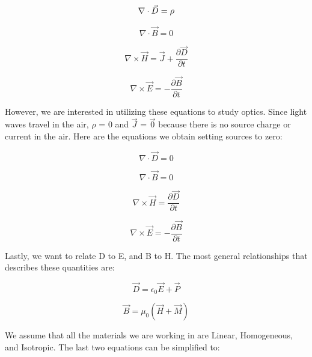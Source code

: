\documentclass[12pt]{article}
\begin{document}
\begin{equation}
	\nabla \cdot \vec{D} = \rho\\
\end{equation}

\begin{equation}
	\nabla \cdot \vec{B} = 0
\end{equation}

\begin{equation}
	\nabla \times \vec{H} = \vec{J} + \frac{\partial \vec{D}}{\partial t}
\end{equation}

\begin{equation}
	\nabla \times \vec{E} = -\frac{\partial \vec{B}}{\partial t}
\end{equation}

However, we are interested in utilizing these equations to study optics. Since light waves travel in the air, \(\rho\) = 0 and \(\vec{J}\) = \(\vec{0}\) because there is no source charge or current in the air. Here are the equations we obtain setting sources to zero:

\begin{equation}
	\nabla \cdot \vec{D} = 0
\end{equation}

\begin{equation}
	\nabla \cdot \vec{B} = 0
\end{equation}

\begin{equation}
	\nabla \times \vec{H} = \frac{\partial \vec{D}}{\partial t}
\end{equation}

\begin{equation}
	\nabla \times \vec{E} = -\frac{\partial \vec{B}}{\partial t}
\end{equation}

Lastly, we want to relate D to E, and B to H. The most general relationships that describes these quantities are:

\begin{equation}
	\vec{D} = \epsilon_{0}\vec{E} + \vec{P}
\end{equation}

\begin{equation}
	\vec{B} = \mu_{0}(\vec{H} + \vec{M})
\end{equation}

We assume that all the materials we are working in are Linear, Homogeneous, and Isotropic. The last two equations can be simplified to:
\end{document}
